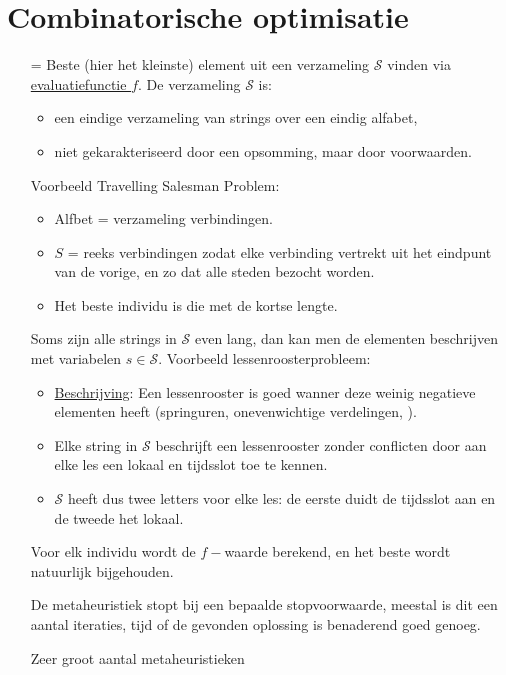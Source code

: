 \documentclass{report}
\begin{document}
\section{Combinatorische optimisatie}
\begin{itemize}
	\item[=] Beste (hier het kleinste) element uit een verzameling $\mathcal{S}$ vinden via \underline{evaluatiefunctie $f$}. De verzameling $\mathcal{S}$ is:
	\begin{itemize}
		\item een eindige verzameling van strings over een eindig alfabet,
		\item niet gekarakteriseerd door een opsomming, maar door voorwaarden.
	\end{itemize}
	\item[\info] Voorbeeld Travelling Salesman Problem:
	\begin{itemize}
		\item Alfbet = verzameling verbindingen.
		\item $S$ = reeks verbindingen zodat elke verbinding vertrekt uit het eindpunt van de vorige, en zo dat alle steden bezocht worden.
		\item Het beste individu is die met de kortse lengte.
	\end{itemize}
	\item[\info] Soms zijn alle strings in $\mathcal{S}$ even lang, dan kan men de elementen beschrijven met variabelen $s \in \mathcal{S}$. Voorbeeld lessenroosterprobleem:
	\begin{itemize}
		\item \underline{Beschrijving}: Een lessenrooster is goed wanner deze weinig negatieve elementen heeft (springuren, onevenwichtige verdelingen, ).
		\item Elke string in $\mathcal{S}$ beschrijft een lessenrooster zonder conflicten door aan elke les een lokaal en tijdsslot toe te kennen.
		\item $\mathcal{S}$ heeft dus twee letters voor elke les: de eerste duidt de tijdsslot aan en de tweede het lokaal.
	\end{itemize}
	\item[\info] Voor elk individu wordt de $f-$waarde berekend, en het beste wordt natuurlijk bijgehouden.
	\item[\info] De metaheuristiek stopt bij een bepaalde stopvoorwaarde, meestal is dit een aantal iteraties, tijd of de gevonden oplossing is benaderend goed genoeg.
	\item[\info] Zeer groot aantal metaheuristieken
\end{itemize}
\end{document}
